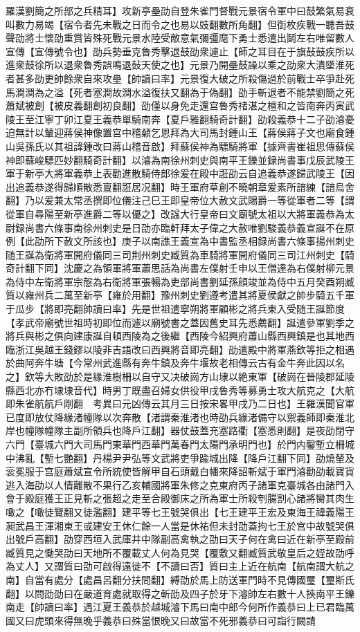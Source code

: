 羅漢劉簡之所部之兵精耳】攻新亭壘劭自登朱雀門督戰元景宿令軍中曰鼓繁氣易衰叫數力易竭【宿令者先未戰之日而令之也易以豉翻數所角翻】但衘枚疾戰一聽吾鼓聲劭將士懷劭重賞皆殊死戰元景水陸受敵意氣彌彊麾下勇士悉遣出鬬左右唯留數人宣傳【宣傳號令也】劭兵勢垂克魯秀擊退鼓劭衆遽止【師之耳目在于旗鼔鼓疾所以進衆鼓徐所以退衆魯秀誤鳴退鼔天使之也】元景乃開壘鼓譟以乘之劭衆大潰墜淮死者甚多劭更帥餘衆自來攻壘【帥讀曰率】元景復大破之所殺傷過於前戰士卒爭赴死馬澗澗為之溢【死者塞澗故澗水溢復扶又翻為于偽翻】劭手斬退者不能禁劉簡之死蕭斌被創【被皮義翻創初良翻】劭僅以身免走還宫魯秀禇湛之檀和之皆南奔丙寅武陵王至江寧丁卯江夏王義恭單騎南奔【夏戶雅翻騎奇計翻】劭殺義恭十二子劭濬憂迫無計以輦迎蔣侯神像置宫中稽顙乞恩拜為大司馬封鍾山王【蔣侯蔣子文也廟食鍾山吳孫氏以其祖諱鍾改曰蔣山稽音啟】拜蘇侯神為驃騎將軍【據齊書崔祖思傳蘇侯神即蘇峻驃匹妙翻騎奇計翻】以濬為南徐州刺史與南平王鑠並録尚書事戊辰武陵王軍于新亭大將軍義恭上表勸進散騎侍郎徐爰在殿中誑劭云自追義恭遂歸武陵王【因出追義恭遂得歸順散悉亶翻誑居况翻】時王軍府草創不曉朝章爰素所諳練【諳烏舍翻】乃以爰兼太常丞撰即位儀注己巳王即皇帝位大赦文武賜爵一等從軍者二等【謂從軍自尋陽至新亭進爵二等以優之】改諡大行皇帝曰文廟號太祖以大將軍義恭為太尉録尚書六條事南徐州刺史是日劭亦臨軒拜太子偉之大赦唯劉駿義恭義宣誕不在原例【此劭所下赦文所該也】庚子以南譙王義宣為中書監丞相録尚書六條事揚州刺史随王誕為衛將軍開府儀同三司荆州刺史臧質為車騎將軍開府儀同三司江州刺史【騎奇計翻下同】沈慶之為領軍將軍蕭思話為尚書左僕射壬申以王僧達為右僕射柳元景為侍中左衛將軍宗慤為右衛將軍張暢為吏部尚書劉延孫顔竣並為侍中五月癸酉朔臧質以雍州兵二萬至新亭【雍於用翻】豫州刺史劉遵考遣其將夏侯獻之帥步騎五千軍于瓜步【將即亮翻帥讀曰率】先是世祖遣寧朔將軍顧彬之將兵東入受随王誕節度【孝武帝廟號世祖時初即位而遽以廟號書之蓋因舊史耳先悉薦翻】誕遣參軍劉季之將兵與彬之俱向建康誕自頓西陵為之後繼【西陵今紹興府蕭山縣西興鎮是也其地西臨浙江吳越王錢鏐以陵非吉語改曰西興將音即亮翻】劭遣殿中將軍燕欽等拒之相遇於曲阿奔牛塘【今常州武進縣有奔牛鎮及奔牛堰故老相傳云古有金牛奔此因以名之】欽等大敗劭於是緣淮樹柵以自守又决破崗方山埭以絶東軍【破崗在晉陵郡延陵縣西北亦冇埭埭音代】時男丁既盡召婦女供役甲戌魯秀等募勇士攻大航克之【大航即朱雀航航戶剛翻　考異曰元凶傳云其月三日按宋畧甲戌乃二日也】王羅漢聞官軍已度即放仗降緣渚幢隊以次奔散【渚謂秦淮渚也時劭兵緣渚備守以禦義師即秦淮北岸也幢隊幢隊主副所領兵也降戶江翻】器仗鼓蓋充塞路衢【塞悉則翻】是夜劭閉守六門【臺城六門大司馬門東華門西華門萬春門太陽門承明門也】於門内鑿塹立柵城中沸亂【塹七艷翻】丹楊尹尹弘等文武將吏爭踰城出降【降戶江翻下同】劭燒輦及衮冕服于宫庭蕭斌宣令所統使皆解甲自石頭戴白幡來降詔斬斌于軍門濬勸劭載寶貨逃入海劭以人情離散不果行乙亥輔國將軍朱修之克東府丙子諸軍克臺城各由諸門入會于殿庭獲王正見斬之張超之走至合殿御床之所為軍士所殺刳腸割心諸將臠其肉生噉之【噉徒覽翻又徒濫翻】建平等七王號哭俱出【七王建平王宏及東海王禕義陽王昶武昌王渾湘東王或建安王休仁餘一人當是休祐但未封劭蓋拘七王於宫中故號哭俱出號戶高翻】劭穿西垣入武庫井中隊副高禽執之劭曰天子何在禽曰近在新亭至殿前臧質見之慟哭劭曰天地所不覆載丈人何為見哭【覆敷又翻臧質武敬皇后之姪故劭呼為丈人】又謂質曰劭可啟得遠徙不【不讀曰否】質曰主上近在航南【航南謂大航之南】自當有處分【處昌呂翻分扶問翻】縛劭於馬上防送軍門時不見傳國璽【璽斯氏翻】以問劭劭曰在嚴道育處就取得之斬劭及四子於牙下濬帥左右數十人挾南平王鑠南走【帥讀曰率】遇江夏王義恭於越城濬下馬曰南中郎今何所作義恭曰上已君臨萬國又曰虎頭來得無晚乎義恭曰殊當恨晚又曰故當不死邪義恭曰可詣行闕請